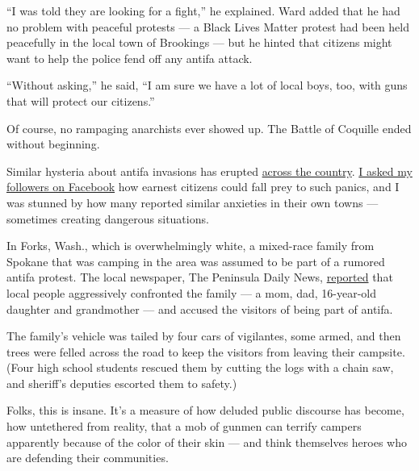 ``I was told they are looking for a fight,'' he explained. Ward added
that he had no problem with peaceful protests --- a Black Lives Matter
protest had been held peacefully in the local town of Brookings --- but
he hinted that citizens might want to help the police fend off any
antifa attack.

``Without asking,'' he said, ``I am sure we have a lot of local boys,
too, with guns that will protect our citizens.''

Of course, no rampaging anarchists ever showed up. The Battle of
Coquille ended without beginning.

Similar hysteria about antifa invasions has erupted
\href{https://www.detroitnews.com/story/news/nation/2020/06/02/false-claims-antifa-protesters-plague-small-us-cities/111899444/}{across
the country}.
\href{https://www.facebook.com/kristof/posts/10159885205317891?__xts__\%5b0\%5d=68.ARAVnkUTUgiRHe7PEE2SsJ8HPxpc50fo9LzoUWxjsgXHvmgtl-NE8VFhGrr4qBIZt7cxN9cvFsH8nVaD0IAVqLeyGe7KsnhjpJxJb8pio_yTPi6m0aKQr8SwTr1950y6fKrObouJIz5ai3L0XEqb0RcN7XnNtGyglUdu76Md2B5qCreEQMveNjWjaw2lNQEAYlSuU7uENm2F8fae1WBozYwBtzgYayLDzVJhZ_VJMsDq9qhaDDQVQ8v3ZxNpcLWJz2PlRPJ8lcd_QsctED82cujRarYxRMSyx0RwGUj-zvljdBuF-sPSdIKyFNo5GE3RBu_qSCL7TUQ\&__tn__=-R}{I
asked my followers on Facebook} how earnest citizens could fall prey to
such panics, and I was stunned by how many reported similar anxieties in
their own towns --- sometimes creating dangerous situations.

In Forks, Wash., which is overwhelmingly white, a mixed-race family from
Spokane that was camping in the area was assumed to be part of a rumored
antifa protest. The local newspaper, The Peninsula Daily News,
\href{https://www.peninsuladailynews.com/crime/family-harassed-in-forks-after-being-accused-of-being-members-of-antifa/}{reported}
that local people aggressively confronted the family --- a mom, dad,
16-year-old daughter and grandmother --- and accused the visitors of
being part of antifa.

The family's vehicle was tailed by four cars of vigilantes, some armed,
and then trees were felled across the road to keep the visitors from
leaving their campsite. (Four high school students rescued them by
cutting the logs with a chain saw, and sheriff's deputies escorted them
to safety.)

Folks, this is insane. It's a measure of how deluded public discourse
has become, how untethered from reality, that a mob of gunmen can
terrify campers apparently because of the color of their skin --- and
think themselves heroes who are defending their communities.

